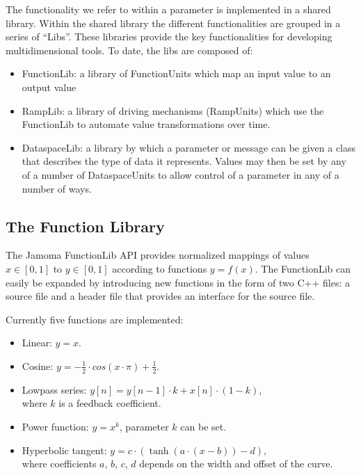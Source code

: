 \documentclass{article}
\begin{document}
The functionality we refer to within a parameter is implemented in a shared library. Within the shared library the different functionalities are grouped in a series of ``Libs''.  These libraries provide the key functionalities for developing multidimensional tools.  To date, the libs are composed of:
\begin{itemize}
	\item FunctionLib: a library of FunctionUnits which map an input value to an output value
	\item RampLib: a library of driving mechanisms (RampUnits) which use the FunctionLib to automate value transformations over time.
	\item DataspaceLib: a library by which a parameter or message can be given a class that describes the type of data it represents.  Values may then be set by any of a number of DataspaceUnits to allow control of a parameter in any of a number of ways.
\end{itemize}


\subsection{The Function Library}\label{sec:functionlib}
\label{sec:function_lib}
The Jamoma FunctionLib API provides normalized mappings of values $x \in [0,1]$ to $y \in [0,1]$ according to functions $y = f(x)$. The FunctionLib can easily be expanded by introducing new functions in the form of two C++ files: a source file and a header file that provides an interface for the source file.

Currently five functions are implemented: 

\begin{itemize}
	\item Linear: $y = x$.
	\item Cosine: $y = - \frac{1}{2} \cdot cos(x \cdot \pi ) + \frac{1}{2} $.
	\item Lowpass series: $y[n] = y[n-1] \cdot k + x[n] \cdot (1-k)$, \\ where $k$ is a feedback coefficient.
	\item Power function: $ y = x^{k} $, parameter $k$ can be set.
	\item Hyperbolic tangent: $ y = c \cdot (\tanh(a\cdot(x-b)) - d) $, \\ where coefficients $a$, $b$, $c$, $d$ depends on the width and offset of the curve.
\end{itemize}
\end{document}

